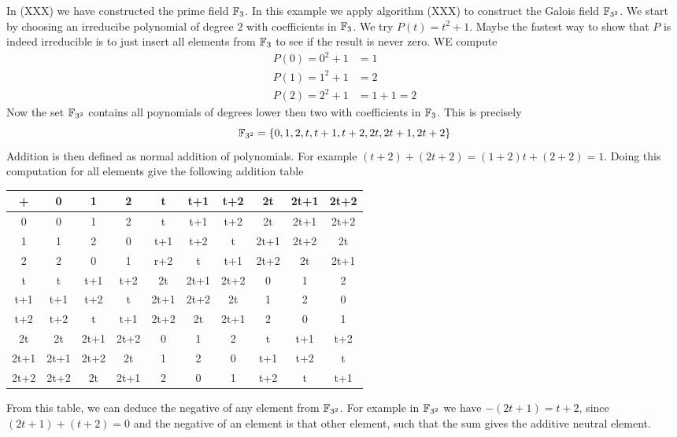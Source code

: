 \begin{example}In (XXX) we have constructed the prime field $\mathbb{F}_3$. In this example we apply algorithm (XXX) to construct the Galois field $\mathbb{F}_{3^2}$. We start by choosing an irreducibe polynomial of degree $2$ with coefficients in $\mathbb{F}_3$. We try 
$P(t)=t^2+1$. Maybe the fastest way to show that $P$ is indeed irreducible is to just insert all elements from $\mathbb{F}_3$ to see if the result is never zero. WE compute
\begin{align*}
P(0) = 0^2+1 &= 1\\
P(1) = 1^2+1 &= 2\\
P(2) = 2^2+1 &=  1+1  = 2
\end{align*}
Now the set $\mathbb{F}_{3^2}$ contains all poynomials of degrees lower then two with coefficients in $\mathbb{F}_3$. This is precisely
$$
\mathbb{F}_{3^2}=\{0,1,2,t,t+1,t+2,2t,2t+1,2t+2\}
$$
Addition is then defined as normal addition of polynomials. For example 
$(t+2) + (2t+2)= (1+2)t +(2+2)= 1$. Doing this computation for all elements give the following addition table
\begin{center}
  \begin{tabular}{c | c c c c c c c c c}
    + & 0    & 1    & 2    & t    & t+1  & t+2  & 2t   & 2t+1 & 2t+2 \\\hline
    0 & 0    & 1    & 2    & t    & t+1  & t+2  & 2t   & 2t+1 & 2t+2 \\
    1 & 1    & 2    & 0    & t+1  & t+2  & t    & 2t+1 & 2t+2 & 2t   \\
    2 & 2    & 0    & 1    & r+2  & t    & t+1  & 2t+2 & 2t   & 2t+1 \\
    t & t    & t+1  & t+2  & 2t   & 2t+1 & 2t+2 & 0    & 1    & 2    \\
  t+1 & t+1  & t+2  & t    & 2t+1 & 2t+2 & 2t   & 1    & 2    & 0    \\
  t+2 & t+2  & t    & t+1  & 2t+2 & 2t   & 2t+1 & 2    & 0    & 1    \\
   2t & 2t   & 2t+1 & 2t+2 & 0    & 1    & 2    & t    & t+1  & t+2  \\
 2t+1 & 2t+1 & 2t+2 & 2t   & 1    & 2    & 0    & t+1  & t+2  & t    \\
 2t+2 & 2t+2 & 2t   & 2t+1 & 2    & 0    & 1    & t+2  & t    & t+1
  \end{tabular}
\end{center}
From this table, we can deduce the negative of any element from $\mathbb{F}_{3^2}$. For example in $\mathbb{F}_{3^2}$ we have $-(2t+1)= t+2$, since $(2t+1) + (t+2)=0$ and the negative of an element is that other element, such that the sum gives the additive neutral element.


\end{example}
